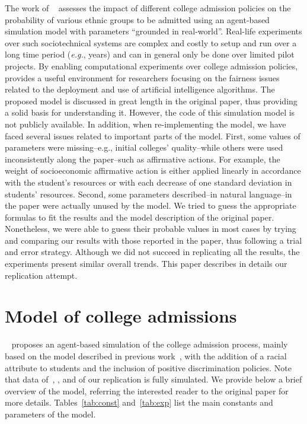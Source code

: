 The work of \citeauthor{reardon2018levels}~\cite{reardon2018levels} assesses the impact of different college admission policies on the probability of various ethnic groups to be admitted using an agent-based simulation model with parameters ``grounded in real-world''.
Real-life experiments over such sociotechnical systems are complex and costly to setup and run over a long time period (\emph{e.g.}, years) and can in general only be done over limited pilot projects.
By enabling computational experiments over college admission policies, \citeauthor{reardon2018levels} provides a useful environment for researchers focusing on the fairness issues related to the deployment and use of artificial intelligence algorithms.
The proposed model is discussed in great length in the original paper, thus providing a solid basis for understanding it.
However, the code of this simulation model is not publicly available.
In addition, when re-implementing the model, we have faced several issues related to important parts of the model.
First, some values of parameters were missing--e.g., initial colleges' quality--while others were used inconsistently along the paper--such as affirmative actions.
For example, the weight of socioeconomic affirmative action is either applied linearly in accordance with the student's resources or with each decrease of one standard deviation in students' resources.
Second, some parameters described--in natural language--in the paper were actually unused by the model. We tried to guess the appropriate formulas to fit the results and the model description of the original paper.
Nonetheless, we were able to guess their probable values in most cases by trying and comparing our results with those reported in the paper, thus following a trial and error strategy.
Although we did not succeed in replicating all the results, the experiments present similar overall trends.
This paper describes in details our replication attempt.

\section{Model of college admissions}

\citeauthor{reardon2018levels}~\cite{reardon2018levels} proposes an agent-based simulation of the college admission process, mainly based on the model described in previous work~\cite{reardon2016agent}, with the addition of a racial attribute to students and the inclusion of positive discrimination policies.
Note that data of~\cite{reardon2018levels}, \cite{reardon2016agent}, and of our replication is fully simulated.
We provide below a brief overview of the model, referring the interested reader to the original paper for more details. Tables~\ref{tab:const} and~\ref{tab:exp} list the main constants and parameters of the model.


